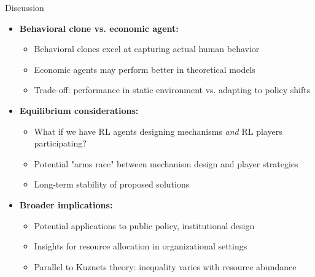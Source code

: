 \documentclass[aspectratio=169]{beamer} %
\begin{document}
\begin{frame}{Discussion}
\begin{itemize}
    \item \textbf{Behavioral clone vs. economic agent:}
    \begin{itemize}
        \item Behavioral clones excel at capturing actual human behavior
        \item Economic agents may perform better in theoretical models
        \item Trade-off: performance in static environment vs. adapting to policy shifts
    \end{itemize}
    
    \item \textbf{Equilibrium considerations:}
    \begin{itemize}
        \item What if we have RL agents designing mechanisms \textit{and} RL players participating?
        \item Potential "arms race" between mechanism design and player strategies
        \item Long-term stability of proposed solutions
    \end{itemize}
    
    \item \textbf{Broader implications:}
    \begin{itemize}
        \item Potential applications to public policy, institutional design
        \item Insights for resource allocation in organizational settings
        \item Parallel to Kuznets theory: inequality varies with resource abundance
    \end{itemize}
\end{itemize}
\end{frame}
\end{document}
